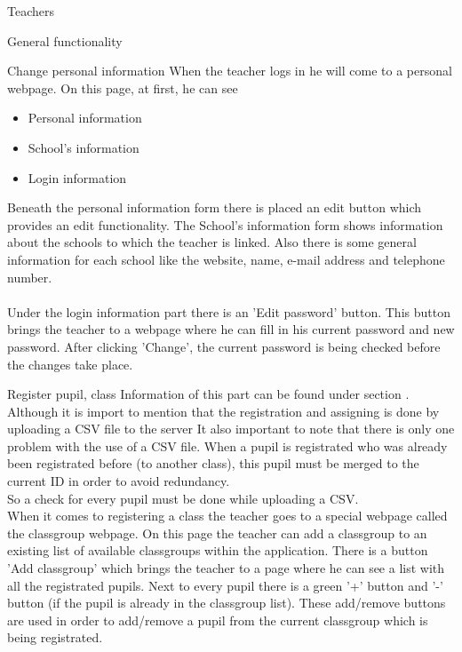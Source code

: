 \begin{section}{Teachers}
\begin{subsection}{General functionality}
    \begin{subsubsection}{Change personal information}
	When the teacher logs in he will come to a personal webpage. On this page, at first, he can see
	\begin{itemize}
		\item Personal information
		\item School's information
		\item Login information
	\end{itemize}	
	Beneath the personal information form there is placed an edit button which provides an edit functionality.
	The School's information form shows information about the schools to which the teacher is linked. Also there is some general
	information for each school like the website, name, e-mail address and telephone number.\\
	\\
	Under the login information part there is an 'Edit password' button. 
	This button brings the teacher to a webpage where he can fill in his current password and new password. 
	After clicking 'Change', the current password is being checked before the changes take place.
	\end{subsubsection}
	\begin{subsubsection}{Register pupil, class}
	Information of this part can be found under section .\\
	Although it is import to mention that the registration and assigning is done by uploading a CSV file to the server
	It also important to note that there is only one problem with the use of a CSV file. When a pupil is registrated who
	was already been registrated before (to another class), this pupil must be merged to the current ID in order to avoid
	redundancy.\\
	So a check for every pupil must be done while uploading a CSV. \\
	When it comes to registering a class the teacher goes to a special webpage called the classgroup webpage. On this page
	the teacher can add a classgroup to an existing list of available classgroups within the application. There is a button
	'Add classgroup' which brings the teacher to a page where he can see a list with all the registrated pupils. Next to every
	pupil there is a green '+' button and '-' button (if the pupil is already in the classgroup list). These add/remove buttons
	are used in order to add/remove a pupil from the current classgroup which is being registrated.\\

\end{subsubsection}
\end{subsection}
\end{section}
